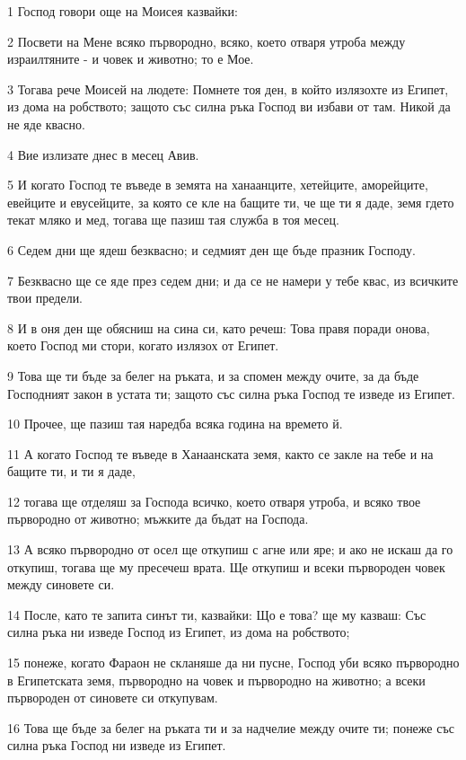 \par 1 Господ говори още на Моисея казвайки:
\par 2 Посвети на Мене всяко първородно, всяко, което отваря утроба между израилтяните - и човек и животно; то е Мое.
\par 3 Тогава рече Моисей на людете: Помнете тоя ден, в който излязохте из Египет, из дома на робството; защото със силна ръка Господ ви избави от там. Никой да не яде квасно.
\par 4 Вие излизате днес в месец Авив.
\par 5 И когато Господ те въведе в земята на ханаанците, хетейците, аморейците, евейците и евусейците, за която се кле на бащите ти, че ще ти я даде, земя гдето текат мляко и мед, тогава ще пазиш тая служба в тоя месец.
\par 6 Седем дни ще ядеш безквасно; и седмият ден ще бъде празник Господу.
\par 7 Безквасно ще се яде през седем дни; и да се не намери у тебе квас, из всичките твои предели.
\par 8 И в оня ден ще обясниш на сина си, като речеш: Това правя поради онова, което Господ ми стори, когато излязох от Египет.
\par 9 Това ще ти бъде за белег на ръката, и за спомен между очите, за да бъде Господният закон в устата ти; защото със силна ръка Господ те изведе из Египет.
\par 10 Прочее, ще пазиш тая наредба всяка година на времето й.
\par 11 А когато Господ те въведе в Ханаанската земя, както се закле на тебе и на бащите ти, и ти я даде,
\par 12 тогава ще отделяш за Господа всичко, което отваря утроба, и всяко твое първородно от животно; мъжките да бъдат на Господа.
\par 13 А всяко първородно от осел ще откупиш с агне или яре; и ако не искаш да го откупиш, тогава ще му пресечеш врата. Ще откупиш и всеки първороден човек между синовете си.
\par 14 После, като те запита синът ти, казвайки: Що е това? ще му казваш: Със силна ръка ни изведе Господ из Египет, из дома на робството;
\par 15 понеже, когато Фараон не скланяше да ни пусне, Господ уби всяко първородно в Египетската земя, първородно на човек и първородно на животно; а всеки първороден от синовете си откупувам.
\par 16 Това ще бъде за белег на ръката ти и за надчелие между очите ти; понеже със силна ръка Господ ни изведе из Египет.

